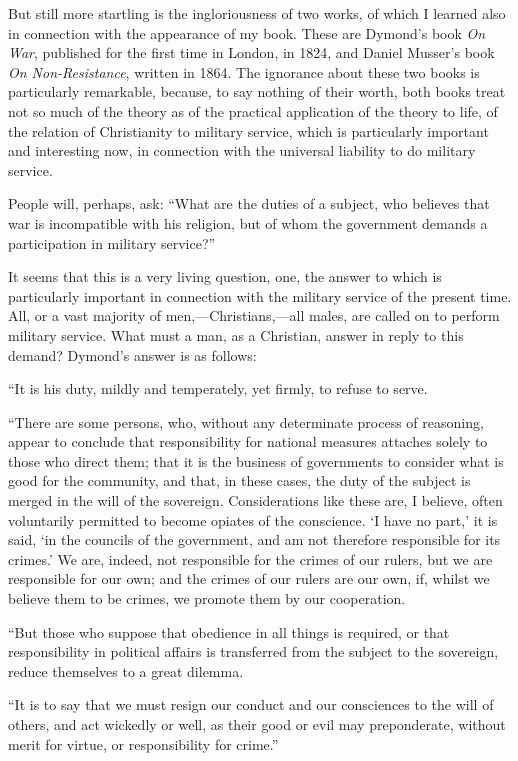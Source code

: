 \documentclass{book}
\begin{document}
But still more startling is the ingloriousness of two works, of which I learned also in connection with the appearance of my book. These are Dymond’s book \emph{On War}, published for the first time in London, in 1824, and Daniel Musser’s book \emph{On Non-Resistance}, written in 1864. The ignorance about these two books is particularly remarkable, because, to say nothing of their worth, both books treat not so much of the theory as of the practical application of the theory to life, of the relation of Christianity to military service, which is particularly important and interesting now, in connection with the universal liability to do military service.

People will, perhaps, ask: “What are the duties of a subject, who believes that war is incompatible with his religion, but of whom the government demands a participation in military service?”

It seems that this is a very living question, one, the answer to which is particularly important in connection with the military service of the present time. All, or a vast majority of men,—Christians,—all males, are called on to perform military service. What must a man, as a Christian, answer in reply to this demand? Dymond’s answer is as follows:

“It is his duty, mildly and temperately, yet firmly, to refuse to serve.

“There are some persons, who, without any determinate process of reasoning, appear to conclude that responsibility for national measures attaches solely to those who direct them; that it is the business of governments to consider what is good for the community, and that, in these cases, the duty of the subject is merged in the will of the sovereign. Considerations like these are, I believe, often voluntarily permitted to become opiates of the conscience. ‘I have no part,’ it is said, ‘in the councils of the government, and am not therefore responsible for its crimes.’ We are, indeed, not responsible for the crimes of our rulers, but we are responsible for our own; and the crimes of our rulers are our own, if, whilst we believe them to be crimes, we promote them by our cooperation.

“But those who suppose that obedience in all things is required, or that responsibility in political affairs is transferred from the subject to the sovereign, reduce themselves to a great dilemma.

“It is to say that we must resign our conduct and our consciences to the will of others, and act wickedly or well, as their good or evil may preponderate, without merit for virtue, or responsibility for crime.”
\end{document}
